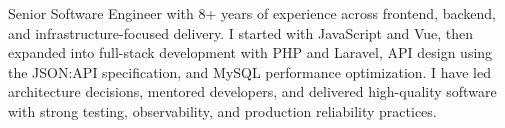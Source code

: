 

\begin{cvparagraph}
    Senior Software Engineer with 8+ years of experience across frontend, backend, and infrastructure-focused delivery. I started with JavaScript and Vue, then expanded into full-stack development with PHP and Laravel, API design using the JSON:API specification, and MySQL performance optimization. I have led architecture decisions, mentored developers, and delivered high-quality software with strong testing, observability, and production reliability practices.
\end{cvparagraph}
